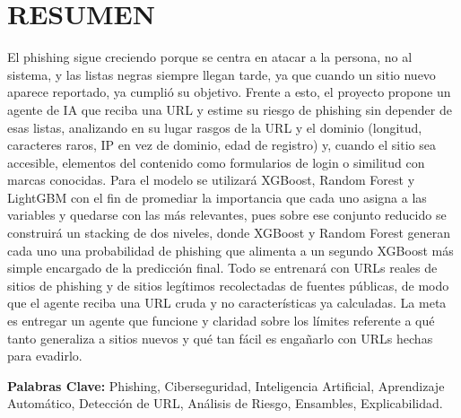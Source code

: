 \section{RESUMEN}
El phishing sigue creciendo porque se centra en atacar a la persona, no al sistema, y las listas negras siempre llegan tarde, ya que cuando un sitio nuevo aparece reportado, ya cumplió su objetivo. Frente a esto, el proyecto propone un agente de IA que reciba una URL y estime su riesgo de phishing sin depender de esas listas, analizando en su lugar rasgos de la URL y el dominio (longitud, caracteres raros, IP en vez de dominio, edad de registro) y, cuando el sitio sea accesible, elementos del contenido como formularios de login o similitud con marcas conocidas. Para el modelo se utilizará XGBoost, Random Forest y LightGBM con el fin de promediar la importancia que cada uno asigna a las variables y quedarse con las más relevantes, pues sobre ese conjunto reducido se construirá un stacking de dos niveles, donde XGBoost y Random Forest generan cada uno una probabilidad de phishing que alimenta a un segundo XGBoost más simple encargado de la predicción final. Todo se entrenará con URLs reales de sitios de phishing y de sitios legítimos recolectadas de fuentes públicas, de modo que el agente reciba una URL cruda y no características ya calculadas. La meta es entregar un agente que funcione y claridad sobre los límites referente a qué tanto generaliza a sitios nuevos y qué tan fácil es engañarlo con URLs hechas para evadirlo.
\newline \par
\textbf{Palabras Clave:} Phishing, Ciberseguridad, Inteligencia Artificial, Aprendizaje Automático, Detección de URL, Análisis de Riesgo, Ensambles, Explicabilidad.
    